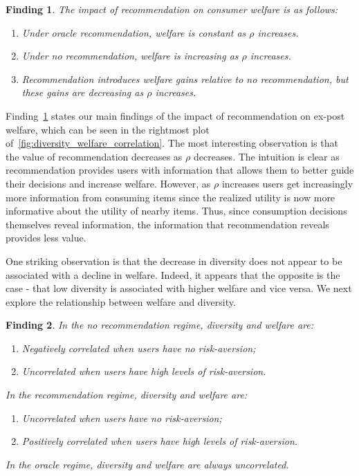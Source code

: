 \documentclass[manuscript]{acmart}
\newtheorem{finding}{Finding}
\begin{document}
\begin{finding}\label{finding_welfare_gap}
The impact of recommendation on consumer welfare is as follows:
\begin{enumerate}
\item Under oracle recommendation, welfare is constant as $\rho$ increases.
\item Under no recommendation, welfare is increasing as $\rho$ increases.
\item Recommendation introduces welfare gains relative to no recommendation, but these gains are decreasing as $\rho$ increases. 
\end{enumerate}
\end{finding}
\par 
Finding~\ref{finding_welfare_gap} states our main findings of the impact of recommendation on ex-post welfare, which can be seen in the rightmost plot of~\autoref{fig:diversity_welfare_correlation}. The most interesting observation is that the value of recommendation decreases as $\rho$ decreases. The intuition is clear as recommendation provides users with information that allows them to better guide their decisions and increase welfare. However, as $\rho$ increases users get increasingly more information from consuming items since the realized utility is now more informative about the utility of nearby items. Thus, since consumption decisions themselves reveal information, the information that recommendation reveals provides less value.
\par 
One striking observation is that the decrease in diversity does not appear to be associated with a decline in welfare. Indeed, it appears that the opposite is the case - that low diversity is associated with higher welfare and vice versa. We next explore the relationship between welfare and diversity.

\begin{finding}\label{finding_diversity_welfare_corr}
In the no recommendation regime, diversity and welfare are:
\begin{enumerate}
\item Negatively correlated when users have no risk-aversion;
\item Uncorrelated when users have high levels of risk-aversion.
\end{enumerate}
In the recommendation regime, diversity and welfare are:
\begin{enumerate}
\item Uncorrelated when users have no risk-aversion;
\item Positively correlated when users have high levels of risk-aversion.
\end{enumerate}
In the oracle regime, diversity and welfare are always uncorrelated.
\end{finding}
\end{document}
